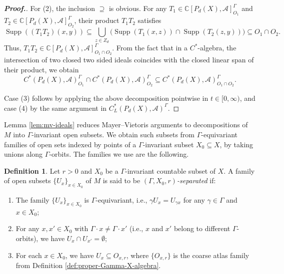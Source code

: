 \documentclass[pdflatex]{sn-jnl}
\theoremstyle{plain}
\theoremstyle{definition}
\newtheorem{definition}[theorem]{Definition}
\begin{document}
\begin{proof}[\textbf{Proof.}]
For (2), the inclusion $\supseteq$ is obvious. For any $T_1 \in\mathbb{C}[P_{d}(X),\mathcal{A}]_{O_1}^\Gamma$ and $T_2\in\mathbb{C}[P_{d}(X),\mathcal{A}]_{O_2}^\Gamma$, their product $T_{1}T_2$ satisfies
\[
\operatorname{Supp}((T_1 T_2)(x, y))\subseteq\bigcup_{z\in Z_{d}}\bigl(\operatorname{Supp}(T_1(x, z))\cap\operatorname{Supp}(T_2(z, y))\bigr)\subseteq O_1\cap O_2.
\]
Thus, $T_1 T_2\in\mathbb{C}[P_{d}(X),\mathcal{A}]_{O_1\cap O_2}^\Gamma$. From the fact that in a $C^*$-algebra, the intersection of two closed two sided ideals coincides with the closed linear span of their product, we obtain $$C^{*}(P_{d}(X),\mathcal{A})_{O_1}^\Gamma\cap C^{*}(P_{d}(X),\mathcal{A})_{O_2}^\Gamma\subseteq C^{*}(P_{d}(X),\mathcal{A})_{O_1\cap O_2}^\Gamma.$$

Case (3) follows by applying the above decomposition pointwise in $t\in[0,\infty)$, and case (4) by the same argument in $C^{*}_{L}(P_{d}(X),\mathcal{A})^\Gamma$.
\end{proof}

Lemma \ref{lem:mv-ideals} reduces Mayer--Vietoris arguments to decompositions of $M$ into $\Gamma$-invariant open subsets. We obtain such subsets from $\Gamma$-equivariant families of open sets indexed by points of a $\Gamma$-invariant subset $X_0\subseteq X$, by taking unions along $\Gamma$-orbits. The families we use are the following.

\begin{definition}\label{definition 3.10}
Let $r>0$ and $X_0$ be a $\Gamma$-invariant countable subset of $X$. A family of open subsets $\{U_x\}_{x\in X_0}$ of $M$ is said to be \emph{$(\Gamma, X_0,r)$-separated} if:
\begin{enumerate}
    \item[(1)] The family $\{U_x\}_{x\in X_0}$ is $\Gamma$-equivariant, i.e., $\gamma U_x=U_{\gamma x}$ for any $\gamma\in\Gamma$ and $x\in X_0$;
    \item[(2)] For any $x, x'\in X_0$ with $\Gamma\cdot x\neq\Gamma\cdot x'$ (i.e., $x$ and $x'$ belong to different $\Gamma$-orbits), we have $U_x\cap U_{x'}=\emptyset$;
    \item[(3)] For each $x\in X_0$, we have $U_x \subseteq O_{x,r}$, where $\{O_{x,r}\}$ is the coarse atlas family from Definition \ref{def:proper-Gamma-X-algebra}.
\end{enumerate}
\end{definition}
\end{document}

